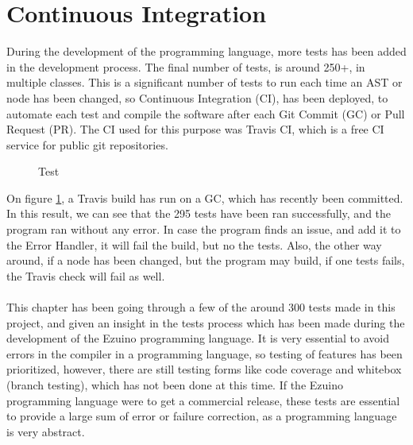 \section{Continuous Integration}
During the development of the programming language, more tests has been added in the development process. The final number of tests, is around 250+, in multiple classes. This is a significant number of tests to run each time an AST or node has been changed, so Continuous Integration (CI), has been deployed, to automate each test and compile the software after each Git Commit (GC) or Pull Request (PR).  The CI used for this purpose was Travis CI, which is a free CI service for public git repositories. \\
\begin{figure}[H]
\centering
{}
\caption{Test}
\label{testa}
\end{figure}
On figure \ref{testa}, a Travis build has run on a GC, which has recently been committed. In this result, we can see that the 295 tests have been ran successfully, and the program ran without any error. In case the program finds an issue, and add it to the Error Handler, it will fail the build, but no the tests. Also, the other way around, if a node has been changed, but the program may build, if one tests fails, the Travis check will fail as well. \\
\\
This chapter has been going through a few of the around 300 tests made in this project, and given an insight in the tests process which has been made during the development of the Ezuino programming language. It is very essential to avoid errors in the compiler in a programming language, so testing of features has been prioritized, however, there are still testing forms like code coverage and whitebox (branch testing), which has not been done at this time. If the Ezuino programming language were to get a commercial release, these tests are essential to provide a large sum of error or failure correction, as a programming language is very abstract. 
